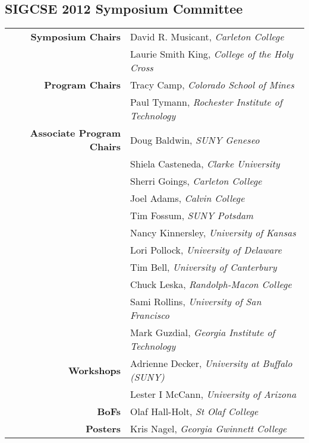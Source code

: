 \newpage
\begin{center}
	\section*{SIGCSE 2012 Symposium Committee}
\end{center}

\vspace{-\baselineskip}
{\raggedright
\begin{tabular}[l]{@{}rp{2.75in}}
	{\textbf{Symposium Chairs}} &
	David R. Musicant, \textit{Carleton College} \\
	& Laurie Smith King, \textit{College of the Holy Cross} \\

	{\textbf{Program Chairs}} &
	Tracy Camp, \textit{Colorado School of Mines} \\
	& \parbox{2.75in}{\raggedright Paul Tymann, \textit{Rochester Institute of Technology}} \\

	{\textbf{Associate Program Chairs}} &
	Doug Baldwin, \textit{SUNY Geneseo} \\
    & Shiela Casteneda, \emph{Clarke University} \\
	& Sherri Goings, \emph{Carleton College} \\
	& Joel Adams, \emph{Calvin College} \\
	& Tim Fossum, \emph{SUNY Potsdam} \\
	& Nancy Kinnersley, \emph{University of Kansas} \\
	& Lori Pollock, \emph{University of Delaware} \\
	& Tim Bell, \emph{University of Canterbury} \\
	& Chuck Leska, \emph{Randolph-Macon College} \\
	& Sami Rollins, \emph{University of San Francisco} \\
	& \parbox{2.75in}{\raggedright Mark Guzdial, \emph{Georgia Institute of Technology}} \\
	{\textbf{Workshops}} &
	Adrienne Decker, \emph{University at Buffalo (SUNY)} \\
	& Lester I McCann, \emph{University of Arizona} \\

	\textbf{BoFs} & Olaf Hall-Holt, \emph{St Olaf College} \\

	\textbf{Posters} & Kris Nagel, \emph{Georgia Gwinnett College} \\


\end{tabular}}
